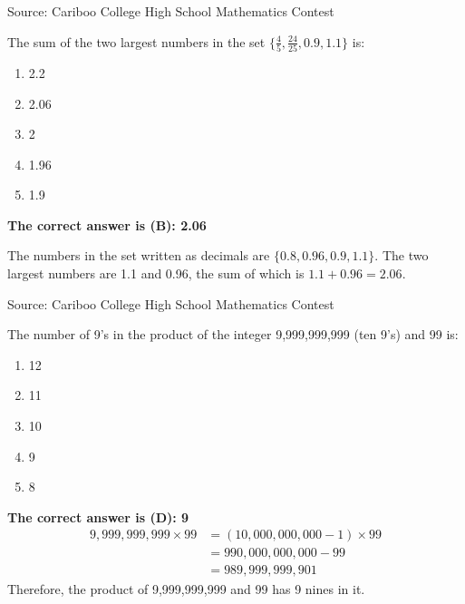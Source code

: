 \documentclass{article}
\begin{document}
\vskip 1.5cm


\scriptsize
Source: Cariboo College High School Mathematics Contest

\normalsize
The sum of the two largest numbers in the set $\bigl\{\frac{4}{5},\frac{24}{25},0.9,1.1\bigr\}$ is:
\begin{enumerate}[noitemsep,topsep=0mm,leftmargin=*,widest=D,label=\Alph*)]
	\item 2.2
	\item 2.06
	\item 2
	\item 1.96
	\item 1.9
\end{enumerate}

\textbf{The correct answer is (B): 2.06}

The numbers in the set written as decimals are $\{0.8,0.96,0.9,1.1\}$. The two largest numbers are 1.1 and 0.96, the sum of which is $1.1+0.96=2.06$.

\vskip 1.5cm


\scriptsize
Source: Cariboo College High School Mathematics Contest

\normalsize
The number of 9's in the product of the integer 9,999,999,999 (ten 9's) and 99 is:
\begin{enumerate}[noitemsep,topsep=0mm,leftmargin=*,widest=D,label=\Alph*)]
	\item 12
	\item 11
	\item 10
	\item 9
	\item 8
\end{enumerate}

\textbf{The correct answer is (D): 9}
\begin{align*}
9,999,999,999 \times 99 &= (10,000,000,000 -1) \times 99\\
&= 990,000,000,000 - 99\\
&= 989,999,999,901
\end{align*}
Therefore, the product of 9,999,999,999 and 99 has 9 nines in it.
\end{document}
